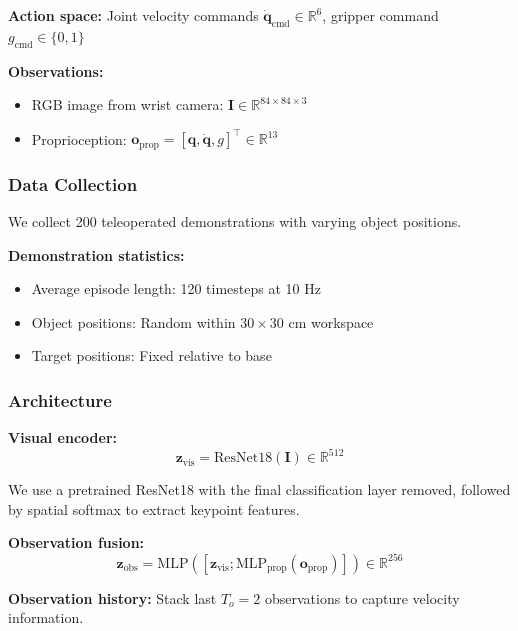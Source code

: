 \textbf{Action space:} Joint velocity commands $\dot{\mathbf{q}}_{\text{cmd}} \in \mathbb{R}^6$, gripper command $g_{\text{cmd}} \in \{0, 1\}$

\textbf{Observations:}
\begin{itemize}
    \item RGB image from wrist camera: $\mathbf{I} \in \mathbb{R}^{84 \times 84 \times 3}$
    \item Proprioception: $\mathbf{o}_{\text{prop}} = [\mathbf{q}, \dot{\mathbf{q}}, g]^\top \in \mathbb{R}^{13}$
\end{itemize}

\subsubsection{Data Collection}

We collect 200 teleoperated demonstrations with varying object positions.

\textbf{Demonstration statistics:}
\begin{itemize}
    \item Average episode length: 120 timesteps at 10 Hz
    \item Object positions: Random within $30 \times 30$ cm workspace
    \item Target positions: Fixed relative to base
\end{itemize}

\subsubsection{Architecture}

\textbf{Visual encoder:}
\begin{equation}
\mathbf{z}_{\text{vis}} = \text{ResNet18}(\mathbf{I}) \in \mathbb{R}^{512}
\label{eq:example3_visual_encoder}
\end{equation}

We use a pretrained ResNet18 with the final classification layer removed, followed by spatial softmax to extract keypoint features.

\textbf{Observation fusion:}
\begin{equation}
\mathbf{z}_{\text{obs}} = \text{MLP}([\mathbf{z}_{\text{vis}}; \text{MLP}_{\text{prop}}(\mathbf{o}_{\text{prop}})]) \in \mathbb{R}^{256}
\label{eq:example3_fusion}
\end{equation}

\textbf{Observation history:} Stack last $T_o = 2$ observations to capture velocity information.

